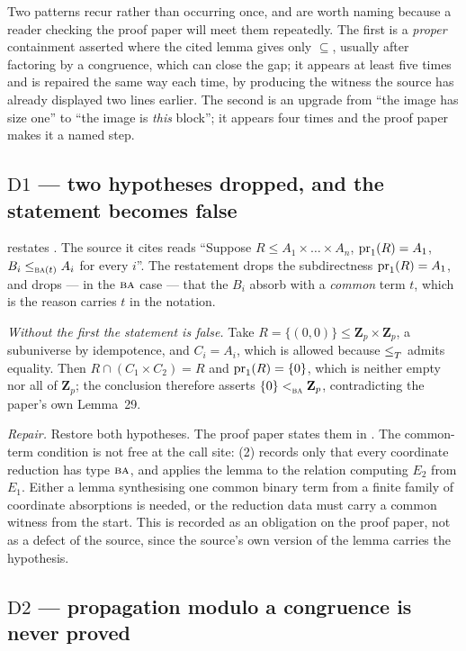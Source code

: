 Two patterns recur rather than occurring once, and are worth naming because a
reader checking the proof paper will meet them repeatedly. The first is a
\emph{proper} containment asserted where the cited lemma gives only
$\subseteq$, usually after factoring by a congruence, which can close the gap;
it appears at least five times and is repaired the same way each time, by
producing the witness the source has already displayed two lines earlier. The
second is an upgrade from ``the image has size one'' to ``the image is
\emph{this} block''; it appears four times and the proof paper makes it a named
step.

\subsection{$\mathrm D1$ --- two hypotheses dropped, and the statement becomes false}
\label{sec:D1}

\cite[Lem.~19]{ZhukSimplified} restates \cite[Cor.~6.1.2, 6.9.2]{ZhukStrong}.
The source it cites reads ``Suppose $R\le A_{1}\times\dots\times A_{n}$,
$\operatorname*{pr}_{1}(R)=A_{1}$, $B_{i}\le_{\textup{\textsc{ba}}(t)}A_{i}$ for every $i$''. The
restatement drops the subdirectness $\operatorname*{pr}_{1}(R)=A_{1}$, and drops --- in the
$\textup{\textsc{ba}}$ case --- that the $B_{i}$ absorb with a \emph{common} term $t$, which is
the reason \cite{ZhukStrong} carries $t$ in the notation.

\emph{Without the first the statement is false.} Take
$R=\{(0,0)\}\le\mathbf Z_{p}\times\mathbf Z_{p}$, a subuniverse by
idempotence, and $C_{i}=A_{i}$, which is allowed because $\le_{T}^{}$ admits
equality. Then $R\cap(C_{1}\times C_{2})=R$ and $\operatorname*{pr}_{1}(R)=\{0\}$, which is
neither empty nor all of $\mathbf Z_{p}$; the conclusion therefore asserts
$\{0\}<_{\textup{\textsc{ba}}}^{}\mathbf Z_{p}$, contradicting the paper's own Lemma~29.

\emph{Repair.} Restore both hypotheses. The proof paper states them in
. The common-term condition is not free at the
call site: (2) records only that every coordinate
reduction has type $\textup{\textsc{ba}}$, and applies the lemma to the relation computing
$E_{2}$ from $E_{1}$. Either a lemma synthesising one common binary term from a
finite family of coordinate absorptions is needed, or the reduction data must
carry a common witness from the start. This is recorded as an obligation on the
proof paper, not as a defect of the source, since the source's own version of
the lemma carries the hypothesis.

\subsection{$\mathrm D2$ --- propagation modulo a congruence is never proved}
\label{sec:D2}

